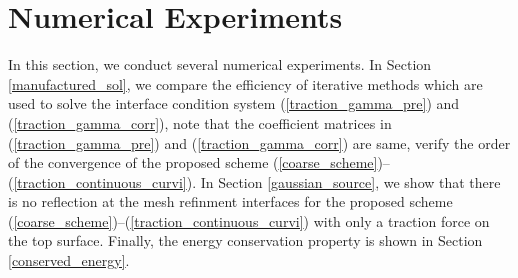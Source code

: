 \documentclass[a4paper]{article}
\begin{document}
\section{Numerical Experiments}
In this section, we conduct several numerical experiments. In Section \ref{manufactured_sol}, we compare the efficiency of iterative methods which are used to solve the interface condition system (\ref{traction_gamma_pre}) and (\ref{traction_gamma_corr}), note that the coefficient matrices in (\ref{traction_gamma_pre}) and (\ref{traction_gamma_corr}) are same, verify the order of the convergence of the proposed scheme (\ref{coarse_scheme})--(\ref{traction_continuous_curvi}). In Section \ref{gaussian_source}, we show that there is no reflection at the mesh refinment interfaces for the proposed scheme (\ref{coarse_scheme})--(\ref{traction_continuous_curvi}) with only a traction force on the top surface. Finally, the energy conservation property is shown in Section \ref{conserved_energy}.
\end{document}
